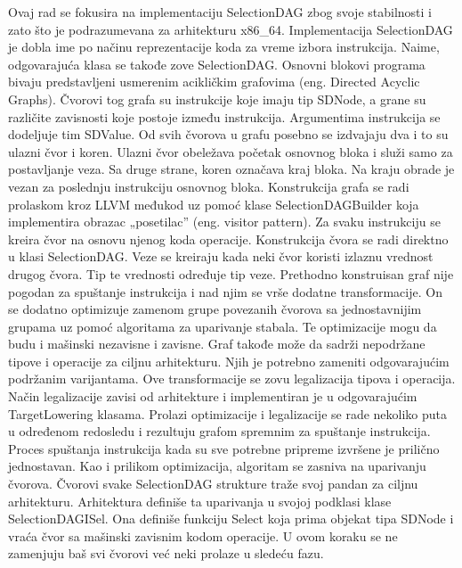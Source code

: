 \documentclass[12pt,oneside]{memoir}
\begin{document}
Ovaj rad se fokusira na implementaciju SelectionDAG zbog svoje stabilnosti i zato
što je podrazumevana za arhitekturu x86\_64.
Implementacija SelectionDAG je dobla ime po načinu reprezentacije koda za
vreme izbora instrukcija. Naime, odgovarajuća klasa se takođe zove SelectionDAG.
Osnovni blokovi programa bivaju predstavljeni usmerenim acikličkim grafovima (eng. Directed Acyclic Graphs). Čvorovi tog grafa su instrukcije koje imaju tip SDNode, a
grane su različite zavisnosti koje postoje između instrukcija. Argumentima instrukcija se dodeljuje tim SDValue. Od svih čvorova u grafu posebno se izdvajaju dva i to su ulazni čvor i koren. Ulazni čvor obeležava početak osnovnog bloka i služi samo
za postavljanje veza. Sa druge strane, koren označava kraj bloka. Na kraju obrade
je vezan za poslednju instrukciju osnovnog bloka.
Konstrukcija grafa se radi prolaskom kroz LLVM međukod uz pomoć klase
SelectionDAGBuilder koja implementira obrazac „posetilac” (eng. visitor pattern). Za svaku instrukciju se kreira čvor na osnovu njenog koda operacije. Konstrukcija čvora se radi direktno u klasi SelectionDAG. Veze se kreiraju kada neki čvor
koristi izlaznu vrednost drugog čvora. Tip te vrednosti određuje tip veze.
Prethodno konstruisan graf nije pogodan za spuštanje instrukcija i nad njim se
vrše dodatne transformacije. On se dodatno optimizuje zamenom grupe povezanih
čvorova sa jednostavnijim grupama uz pomoć algoritama za uparivanje stabala. Te
optimizacije mogu da budu i mašinski nezavisne i zavisne. Graf takođe može da
sadrži nepodržane tipove i operacije za ciljnu arhitekturu. Njih je potrebno zameniti odgovarajućim podržanim varijantama. Ove transformacije se zovu legalizacija
tipova i operacija. Način legalizacije zavisi od arhitekture i implementiran je u odgovarajućim TargetLowering klasama. Prolazi optimizacije i legalizacije se rade
nekoliko puta u određenom redosledu i rezultuju grafom spremnim za spuštanje
instrukcija.
Proces spuštanja instrukcija kada su sve potrebne pripreme izvršene je prilično
jednostavan. Kao i prilikom optimizacija, algoritam se zasniva na uparivanju čvorova. Čvorovi svake SelectionDAG strukture traže svoj pandan za ciljnu arhitekturu.
Arhitektura definiše ta uparivanja u svojoj podklasi klase SelectionDAGISel. Ona
definiše funkciju Select koja prima objekat tipa SDNode i vraća čvor sa mašinski
zavisnim kodom operacije. U ovom koraku se ne zamenjuju baš svi čvorovi već neki
prolaze u sledeću fazu.
\end{document}
